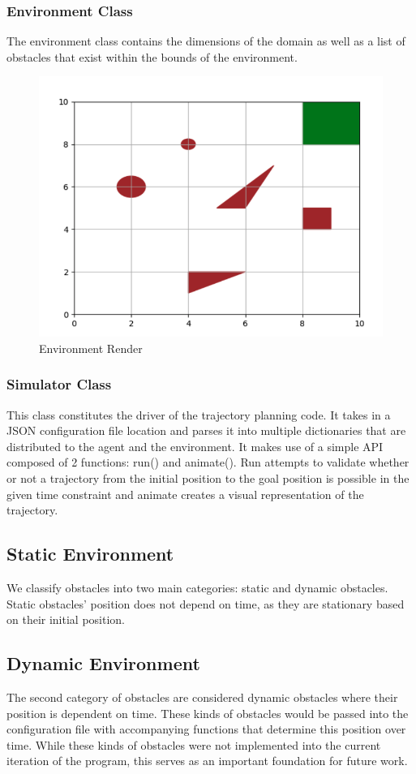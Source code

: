 \documentclass[10pt,letterpaper]{article}
\begin{document}
\subsubsection*{Environment Class}
\noindent The environment class contains the dimensions of the domain as well as a list of obstacles that exist within the bounds of the environment. 

\begin{figure}[!h]
    \centering
    \includegraphics[width= 7 cm]{figures/env1.png}
    \caption{Environment Render}
    \label{fig: env1}
\end{figure}


\subsubsection*{Simulator Class}
This class constitutes the driver of the trajectory planning code. It takes in a JSON configuration file location and parses it into multiple dictionaries that are distributed to the agent and the environment. It makes use of a simple API composed of 2 functions: run() and animate(). Run attempts to validate whether or not a trajectory from the initial position to the goal position is possible in the given time constraint and animate creates a visual representation of the trajectory.


\subsection*{Static Environment}
We classify obstacles into two main categories: static and dynamic obstacles. Static obstacles' position does not depend on time, as they are stationary based on their initial position.

\subsection*{Dynamic Environment}
The second category of obstacles are considered dynamic obstacles where their position is dependent on time. These kinds of obstacles would be passed into the configuration file with accompanying functions that determine this position over time. While these kinds of obstacles were not implemented into the current iteration of the program, this serves as an important foundation for future work. 
\end{document}
